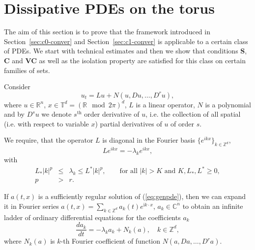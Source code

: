 \section{Dissipative PDEs on the torus }
\label{sec:dissipativePDEs}

The aim of this section is to prove that the framework introduced in Section~\ref{sec:c0-conver} and Section~\ref{sec:c1-conver} is applicable to a certain class of PDEs. We start with technical estimates and then we show that conditions \textbf{S}, \textbf{C} and \textbf{VC} as well as the isolation property are satisfied for this class on certain families of sets.

Consider
\begin{equation}
  u_t = L u + N\left(u,Du,\dots,D^ru\right),  \label{eq:genpde}
\end{equation}
where $u \in \mathbb{R}^n$,  $x \in \mathbb{T}^d=\left(\mathbb{R}\mod 2\pi\right)^d$, $L$ is a linear operator, $N$ is a
polynomial and by $D^s u$ we denote $s^{\text{th}}$ order derivative of
$u$, i.e. the collection of all spatial (i.e. with respect to variable $x$) partial derivatives of $u$ of
order $s$. %

We require, that the operator $L$ is diagonal in the Fourier basis
$\{e^{ikx}\}_{k \in \mathbb{Z}^d}$,
\begin{equation*}
  L e^{ikx}= -\lambda_k e^{ikx},
\end{equation*}
with
\begin{eqnarray}
 L_* |k|^p &\leq& \lambda_k \leq  L^* |k|^p, \qquad \text{for all $|k| > K$ and  $K,L_*,L^* \geq 0$}, \label{eq:lambdak} \\
    p &>& r.  \label{eq:p>r}
\end{eqnarray}


If $a(t,x)$ is a sufficiently regular solution of
(\ref{eq:genpde}), then  we can expand it in Fourier series
$a(t,x)=\sum_{k \in \mathbb{Z}^d} a_k(t)e^{\mathrm{i}k\cdot x}$, $a_k \in \mathbb{C}^n$ to obtain
an infinite ladder of ordinary differential equations for the
coefficients $a_k$
\begin{equation}
  \frac{d a_k}{dt}=-\lambda_k a_k + N_k(a), \quad k \in \mathbb{Z}^d,  \label{eq:fugenpde}
\end{equation}
where $N_k(a)$ is $k$-th Fourier coefficient of function
$N(a,Da,\dots,D^ra)$.




